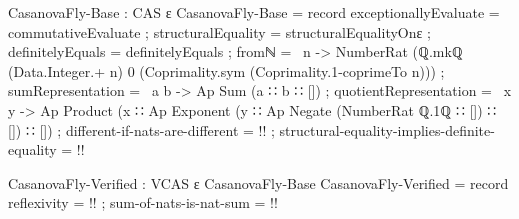 \documentclass{report}
\begin{document}
\begin{code}
CasanovaFly-Base : CAS ε
CasanovaFly-Base = record
  { exceptionallyEvaluate = commutativeEvaluate
  ; structuralEquality = structuralEqualityOnε
  ; definitelyEquals = definitelyEquals
  ; fromℕ = \ n ->
      NumberRat (ℚ.mkℚ (Data.Integer.+ n)
                       0
                       (Coprimality.sym (Coprimality.1-coprimeTo n)))
  ; sumRepresentation = \ a b -> Ap Sum (a ∷ b ∷ [])
  ; quotientRepresentation = \ x y ->
     Ap Product (x ∷ Ap Exponent (y ∷ Ap Negate (NumberRat ℚ.1ℚ ∷ []) ∷ []) ∷ [])
  ; different-if-nats-are-different = {!!}
  ; structural-equality-implies-definite-equality = {!!}
  }

CasanovaFly-Verified : VCAS ε CasanovaFly-Base
CasanovaFly-Verified = record
  {reflexivity = {!!}
  ; sum-of-nats-is-nat-sum = {!!}
  }
\end{code}
\end{document}
